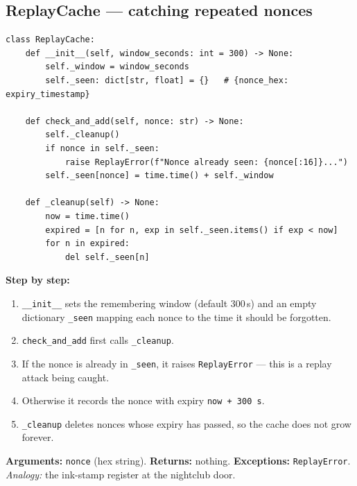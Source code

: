 \documentclass[11pt,a4paper]{report}
\begin{document}
\subsection{ReplayCache --- catching repeated nonces}
\begin{lstlisting}[style=py,caption={auth\_protocol.py --- the replay cache.}]
class ReplayCache:
    def __init__(self, window_seconds: int = 300) -> None:
        self._window = window_seconds
        self._seen: dict[str, float] = {}   # {nonce_hex: expiry_timestamp}

    def check_and_add(self, nonce: str) -> None:
        self._cleanup()
        if nonce in self._seen:
            raise ReplayError(f"Nonce already seen: {nonce[:16]}...")
        self._seen[nonce] = time.time() + self._window

    def _cleanup(self) -> None:
        now = time.time()
        expired = [n for n, exp in self._seen.items() if exp < now]
        for n in expired:
            del self._seen[n]
\end{lstlisting}
\textbf{Step by step:}
\begin{enumerate}
  \item \texttt{\_\_init\_\_} sets the remembering window (default 300\,s) and an
        empty dictionary \texttt{\_seen} mapping each nonce to the time it should
        be forgotten.
  \item \texttt{check\_and\_add} first calls \texttt{\_cleanup}.
  \item If the nonce is already in \texttt{\_seen}, it raises \texttt{ReplayError}
        --- this is a replay attack being caught.
  \item Otherwise it records the nonce with expiry \texttt{now + 300\,s}.
  \item \texttt{\_cleanup} deletes nonces whose expiry has passed, so the cache
        does not grow forever.
\end{enumerate}
\textbf{Arguments:} \texttt{nonce} (hex string). \textbf{Returns:} nothing.
\textbf{Exceptions:} \texttt{ReplayError}. \emph{Analogy:} the ink-stamp register
at the nightclub door.
\end{document}
